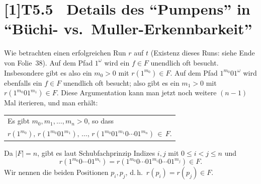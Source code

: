 \documentclass[fontsize=11pt, twoside=false, numbers=autoenddot]{scrbook}
\begin{document}
\section*{\scalebox{.96}[1]{T5.5~ Details des "`Pumpens"' in "`Büchi- vs.\ Muller-Erkennbarkeit"'}}

Wie betrachten einen erfolgreichen Run $r$ auf $t$ (Existenz dieses Runs: siehe Ende von Folie~38).
Auf dem Pfad $1^\omega$ wird ein $f \in F$ unendlich oft besucht.
Insbesondere gibt es also ein $m_0 > 0$ mit $r(1^{m_0}) \in F$.
Auf dem Pfad $1^{m_0}01^\omega$ wird ebenfalls ein $f \in F$ unendlich oft besucht;
also gibt es ein $m_1 > 0$ mit $r(1^{m_0}01^{m_1}) \in F$.
Diese Argumentation kann man jetzt noch weitere $(n-1)$ Mal iterieren,
und man erhält:
%
\begin{center}
  \begin{tabular}{@{}l@{}}
    Es gibt $m_0,m_1,\dots,m_n > 0$, so dass\\[2pt]
    $r(1^{m_0}),\, r(1^{m_0}01^{m_1}),\, \dots,\, r(1^{m_0}01^{m_1}0\cdots01^{m_n}) \,\in\, F$.
  \end{tabular}
\end{center}
%
Da $|F|=n$, gibt es laut Schubfachprinzip Indizes $i,j$ mit $0 \leq i < j \leq n$
und
\[
  r(1^{m_0}0\cdots01^{m_i}) = r(1^{m_0}0\cdots01^{m_i}0\cdots01^{m_j}) \in F.
\]
Wir nennen die beiden Positionen $p_i,p_j$, d.\,h.\ $r(p_i) = r(p_j) \in F$.
\end{document}
